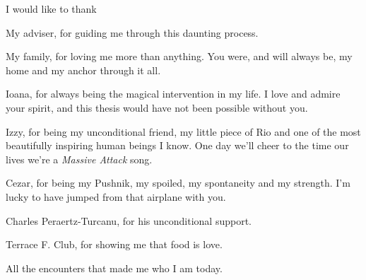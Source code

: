 I would like to thank 

My adviser, for guiding me through this daunting process. \par

My family, for loving me more than anything. You were, and will always be, my home and my anchor through it all. \par

Ioana, for always being the magical intervention in my life. I love and admire your spirit, and this thesis would have not been possible without you. \par

Izzy, for being my unconditional friend, my little piece of Rio and one of the most beautifully inspiring human beings I know. One day we'll cheer to the time our lives we're a \textit{Massive Attack} song. \par

Cezar, for being my Pushnik, my spoiled, my spontaneity and my strength. I'm lucky to have jumped from that airplane with you. \par

Charles Peraertz-Turcanu, for his unconditional support. \par

Terrace F. Club, for showing me that food is love.\par

All the encounters that made me who I am today.

